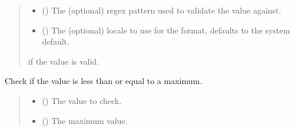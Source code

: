 \documentclass[letterpaper,10pt,english]{sphinxmanual}
\begin{document}
\begin{fulllineitems}
\begin{fulllineitems}
\begin{quote}
\begin{description}
\begin{itemize}
\item {} 
\sphinxAtStartPar
{} () \textendash{} The (optional) regex pattern used to validate the value against.

\item {} 
\sphinxAtStartPar
{} () \textendash{} The (optional) locale to use for the format,
defaults to the system default.

\end{itemize}

\sphinxAtStartPar
{} if the value is valid.

\end{description}\end{quote}

\end{fulllineitems}


\begin{fulllineitems}
\label{\detokenize{apache_commons_validator_python.routines:apache_commons_validator_python.routines.abstract_number_validator.AbstractNumberValidator.max_value}}
\pysigstartsignatures
{}
\pysigstopsignatures
\sphinxAtStartPar
Check if the value is less than or equal to a maximum.
\begin{quote}\begin{description}
\begin{itemize}
\item {} 
\sphinxAtStartPar
{} () \textendash{} The value to check.

\item {} 
\sphinxAtStartPar
{} () \textendash{} The maximum value.


\end{itemize}
\end{description}
\end{quote}
\end{fulllineitems}
\end{fulllineitems}
\end{document}
